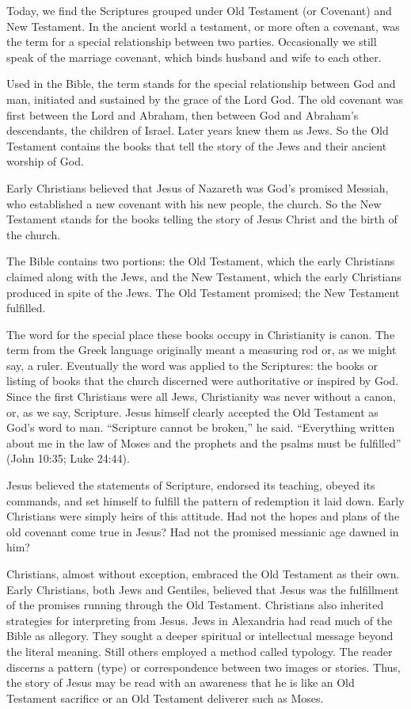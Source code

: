 Today, we find the Scriptures grouped under Old Testament (or Covenant) and New Testament. In the
ancient world a testament, or more often a covenant, was the term for a special relationship between
two parties. Occasionally we still speak of the marriage covenant, which binds husband and wife to
each other.

Used in the Bible, the term stands for the special relationship between God and man, initiated and
sustained by the grace of the Lord God. The old covenant was first between the Lord and Abraham,
then between God and Abraham’s descendants, the children of Israel. Later years knew them as Jews.
So the Old Testament contains the books that tell the story of the Jews and their ancient worship of
God.

Early Christians believed that Jesus of Nazareth was God’s promised Messiah, who established a new
covenant with his new people, the church. So the New Testament stands for the books telling the
story of Jesus Christ and the birth of the church.

The Bible contains two portions: the Old Testament, which the early Christians claimed along with
the Jews, and the New Testament, which the early Christians produced in spite of the Jews. The Old
Testament promised; the New Testament fulfilled.

The word for the special place these books occupy in Christianity is canon. The term from the Greek
language originally meant a measuring rod or, as we might say, a ruler. Eventually the word was
applied to the Scriptures: the books or listing of books that the church discerned were
authoritative or inspired by God. Since the first Christians were all Jews, Christianity was never
without a canon, or, as we say, Scripture. Jesus himself clearly accepted the Old Testament as God’s
word to man. “Scripture cannot be broken,” he said. “Everything written about me in the law of Moses
and the prophets and the psalms must be fulfilled” (John 10:35; Luke 24:44).

Jesus believed the statements of Scripture, endorsed its teaching, obeyed its commands, and set
himself to fulfill the pattern of redemption it laid down. Early Christians were simply heirs of
this attitude. Had not the hopes and plans of the old covenant come true in Jesus? Had not the
promised messianic age dawned in him?

Christians, almost without exception, embraced the Old Testament as their own. Early Christians,
both Jews and Gentiles, believed that Jesus was the fulfillment of the promises running through the
Old Testament. Christians also inherited strategies for interpreting from Jesus. Jews in Alexandria
had read much of the Bible as allegory. They sought a deeper spiritual or intellectual message
beyond the literal meaning. Still others employed a method called typology. The reader discerns a
pattern (type) or correspondence between two images or stories. Thus, the story of Jesus may be read
with an awareness that he is like an Old Testament sacrifice or an Old Testament deliverer such as
Moses.

